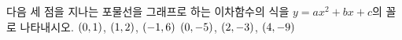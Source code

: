 다음 세 점을 지나는 포물선을 그래프로 하는 이차함수의 식을 $y=ax^2+bx+c$의 꼴로 나타내시오.
 $(0{,}\mkern3mu\mathopen{}1)$, $(1{,}\mkern3mu\mathopen{}2)$, $(-1{,}\mkern3mu\mathopen{}6)$
 $(0{,}\mkern3mu\mathopen{}-5)$, $(2{,}\mkern3mu\mathopen{}-3)$, $(4{,}\mkern3mu\mathopen{}-9)$
